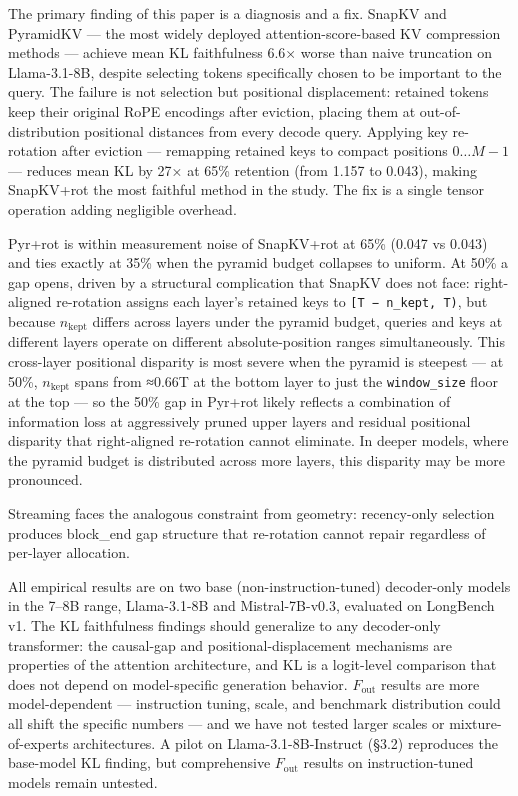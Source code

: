 \documentclass[10pt,letterpaper]{article}
\begin{document}
The primary finding of this paper is a diagnosis and a fix. SnapKV and
PyramidKV --- the most widely deployed attention-score-based KV
compression methods --- achieve mean KL faithfulness 6.6× worse than
naive truncation on Llama-3.1-8B, despite selecting tokens specifically
chosen to be important to the query. The failure is not selection but
positional displacement: retained tokens keep their original RoPE
encodings after eviction, placing them at out-of-distribution positional
distances from every decode query. Applying key re-rotation after
eviction --- remapping retained keys to compact positions
\(0 \ldots M-1\) --- reduces mean KL by 27× at 65\% retention (from
1.157 to 0.043), making SnapKV+rot the most faithful method in the
study. The fix is a
single tensor operation adding negligible overhead.

Pyr+rot is within measurement noise of SnapKV+rot at 65\% (0.047 vs
0.043) and ties exactly at 35\% when the pyramid budget collapses to
uniform. At 50\% a gap opens, driven by a structural complication that
SnapKV does not face: right-aligned re-rotation assigns each layer's
retained keys to \texttt{{[}T\ −\ n\_kept,\ T)}, but because
\(n_{\text{kept}}\) differs across layers under the pyramid budget,
queries and keys at different layers operate on different
absolute-position ranges simultaneously. This cross-layer positional
disparity is most severe when the pyramid is steepest --- at 50\%,
\(n_{\text{kept}}\) spans from ≈0.66T at the bottom layer to just the
\texttt{window\_size} floor at the top --- so the 50\% gap in Pyr+rot
likely reflects a combination of information loss at aggressively pruned
upper layers and residual positional disparity that right-aligned
re-rotation cannot eliminate. In deeper models, where the pyramid budget
is distributed across more layers, this disparity may be more
pronounced.

Streaming faces the analogous constraint from geometry: recency-only
selection produces block\_end gap structure that re-rotation cannot
repair regardless of per-layer allocation.

All empirical results are on two base (non-instruction-tuned)
decoder-only models in the 7--8B range, Llama-3.1-8B and
Mistral-7B-v0.3, evaluated on LongBench v1. The KL faithfulness findings
should generalize to any decoder-only transformer: the causal-gap and
positional-displacement mechanisms are properties of the attention
architecture, and KL is a logit-level comparison that does not depend on
model-specific generation behavior. \(F_{\text{out}}\) results are more
model-dependent --- instruction tuning, scale, and benchmark
distribution could all shift the specific numbers --- and we have not
tested larger scales or mixture-of-experts architectures. A pilot on
Llama-3.1-8B-Instruct (§3.2) reproduces the base-model KL finding, but
comprehensive \(F_{\text{out}}\) results on instruction-tuned models
remain untested.
\end{document}
